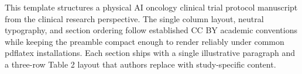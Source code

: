 
This template structures a physical AI oncology clinical trial protocol manuscript from the clinical research perspective. The single column layout, neutral typography, and section ordering follow established CC BY academic conventions while keeping the preamble compact enough to render reliably under common pdflatex installations. Each section ships with a single illustrative paragraph and a three-row Table 2 layout that authors replace with study-specific content.
